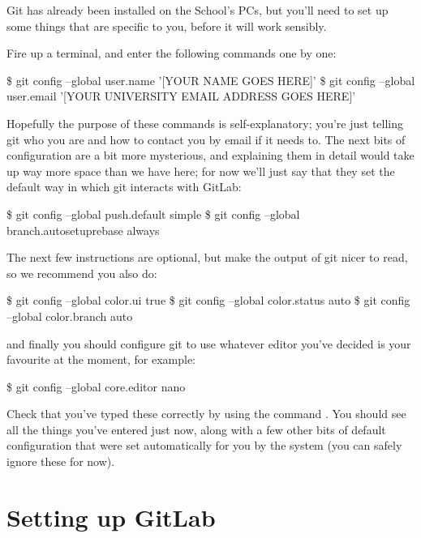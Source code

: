 Git has already been installed on the School's PCs, but you'll need to set up some things that are specific to you, before it will work sensibly. 

Fire up a terminal, and enter the following commands one by one:

\begin{ttoutenv}
\$ git config --global user.name '[YOUR NAME GOES HERE]'
\$ git config --global user.email '[YOUR UNIVERSITY EMAIL ADDRESS GOES HERE]' 
\end{ttoutenv}

Hopefully the purpose of these commands is self-explanatory; you're just telling git who you are and how to contact you by email if it needs to. The next bits of configuration are a bit more mysterious, and explaining them in detail would take up way more space than we have here; for now we'll just say that they set the default way in which git interacts with GitLab:

\begin{ttoutenv}
\$ git config --global push.default simple
\$ git config --global branch.autosetuprebase always 
\end{ttoutenv}

The next few instructions are optional, but make the output of git nicer to read, so we recommend you also do:

\begin{ttoutenv}
\$ git config --global color.ui true
\$ git config --global color.status auto
\$ git config --global color.branch auto 
\end{ttoutenv}

and finally you should configure git to use whatever editor you've decided is your favourite at the moment, for example:

\begin{ttoutenv}
\$ git config --global core.editor nano 
\end{ttoutenv}

Check that you've typed these correctly by using the command . You should see all the things you've entered just now, along with a few other bits of default configuration that were set automatically for you by the system (you can safely ignore these for now).

\section{Setting up GitLab}

